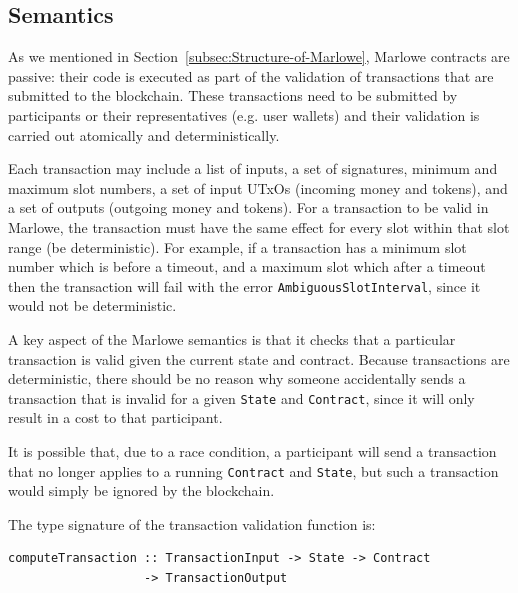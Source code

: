 \documentclass[english,runningheads]{llncs}
\begin{document}
\subsection{Semantics\label{subsec:Marlowe-Semantics}}

As we mentioned in Section~\ref{subsec:Structure-of-Marlowe}, Marlowe
contracts are passive: their code is executed as part of the validation of
transactions that are submitted to the blockchain. These transactions
need to be submitted by participants or their representatives (e.g.
user wallets) and their validation is carried out atomically and
deterministically.

Each transaction may include a list of inputs, a set of signatures,
minimum and maximum slot numbers, a set of input UTxOs (incoming money
and tokens), and a set of outputs (outgoing money and tokens). For
a transaction to be valid in Marlowe, the transaction must have the
same effect for every slot within that slot range (be deterministic).
For example, if a transaction has a minimum slot number which is before
a timeout, and a maximum slot which after a timeout then the transaction
will fail with the error \texttt{AmbiguousSlotInterval}, since it would
not be deterministic.

A key aspect of the Marlowe semantics is that it checks that a particular
transaction is valid given the current state and contract. Because
transactions are deterministic, there should be no reason why someone
accidentally sends a transaction that is invalid for a given \texttt{State}
and \texttt{Contract}, since it will only result in a cost to that participant.

It is possible that, due to a race condition, a participant will send a
transaction that no longer applies to a running \texttt{Contract} and
\texttt{State}, but such a transaction would simply be ignored by the
blockchain.

The type signature of the transaction validation function is:

\begin{verbatim}
computeTransaction :: TransactionInput -> State -> Contract
                   -> TransactionOutput 
\end{verbatim}
\end{document}
